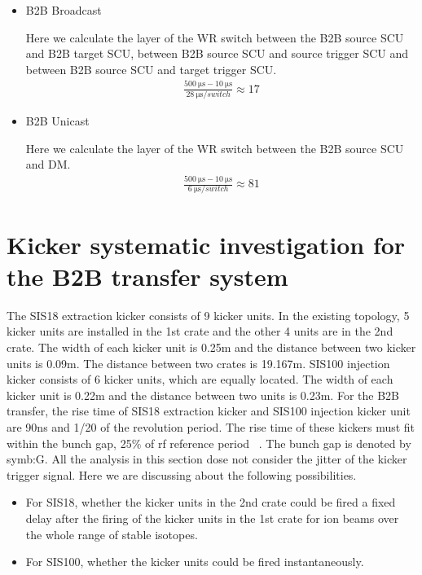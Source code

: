 \begin{itemize}
    \item B2B Broadcast

		Here we calculate the layer of the WR switch between the B2B source \gls{SCU} and B2B target SCU, between B2B source SCU 			and source trigger SCU and between B2B source SCU and target trigger SCU.  
		\begin{equation}
		\begin{aligned}
			\frac{\SI{500}{\us}-\SI{10}{\us}}{\SI{28}{\us/switch}}\approx 17
		\label {num_switch_b}
		\end{aligned}
		\end{equation}
	\item B2B Unicast

		Here we calculate the layer of the WR switch between the B2B source SCU and DM.
		\begin{equation}
		\begin{aligned}
			\frac{\SI{500}{\us}-\SI{10}{\us}}{\SI{6}{\us/switch}}\approx 81
		\label {num_switch_b}
		\end{aligned}
		\end{equation}
\end{itemize}

\section{Kicker systematic investigation for the B2B transfer system}
The SIS18 extraction kicker consists of 9 kicker units. In the existing topology, 5 kicker units are installed in the 1st crate and the other 4 units are in the 2nd crate. The width of each kicker unit is 0.25m and the distance between two kicker units is 0.09m. The distance between two crates is 19.167m. SIS100 injection kicker consists of 6 kicker units, which are equally located. The width of each kicker unit is 0.22m and the distance between two units is 0.23m. For the B2B transfer, the rise time of SIS18 extraction kicker and SIS100 injection kicker unit are 90ns and 1/20 of the revolution period. The rise time of these kickers must fit within the bunch gap, 25$\%$ of rf reference period ~\cite{udo_injection_2014, liebermann_sis100_2013}. The bunch gap is denoted by \gls{symb:G}. All the analysis in this section dose not consider the jitter of the kicker trigger signal. Here we are discussing about the following possibilities. 
\begin{itemize}
    \item For SIS18, whether the kicker units in the 2nd crate could be fired a fixed delay after the firing of the kicker units in the 1st crate for ion beams over the whole range of stable isotopes. 
    \item For SIS100, whether the kicker units could be fired instantaneously. 
\end{itemize} 

